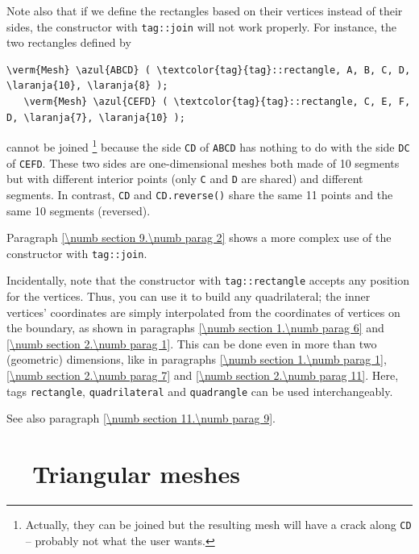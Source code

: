 Note also that if we define the rectangles based on their vertices instead of their sides, 
the {\small\tt {}} constructor with {\small\tt \textcolor{tag}{tag}::join} will
not work properly. 
For instance, the two rectangles defined by

\begin{Verbatim}[commandchars=\\\{\},formatcom=\small\tt,baselinestretch=0.94]
   \verm{Mesh} \azul{ABCD} ( \textcolor{tag}{tag}::rectangle, A, B, C, D, \laranja{10}, \laranja{8} );
   \verm{Mesh} \azul{CEFD} ( \textcolor{tag}{tag}::rectangle, C, E, F, D, \laranja{7}, \laranja{10} );
\end{Verbatim}

\noindent cannot be joined%
\footnote {Actually, they can be joined but the resulting mesh will have
a crack along {\small\tt CD} -- probably not what the user wants.}
because the side {\small\tt CD} of {\small\tt ABCD} has nothing to do with the side 
{\small\tt DC} of {\small\tt CEFD}.
These two sides are one-dimensional meshes both made of 10 segments but with different
interior points (only {\small\tt C} and {\small\tt D} are shared) and different segments.
In contrast, {\small\tt CD} and {\small\tt CD.reverse()} share the same 11 points and
the same 10 segments (reversed).

Paragraph \ref{\numb section 9.\numb parag 2} shows a more complex use of the
{\small\tt {}} constructor with {\small\tt \textcolor{tag}{tag}::join}.

Incidentally, note that the {\small\tt {}} constructor with {\small\tt \textcolor{tag}{tag}::rectangle} accepts
any position for the vertices. 
Thus, you can use it to build any quadrilateral; the inner vertices' coordinates are simply
interpolated from the coordinates of vertices on the boundary, as shown in paragraphs
\ref{\numb section 1.\numb parag 6} and \ref{\numb section 2.\numb parag 1}.
This can be done even in more than two (geometric) dimensions, like in
paragraphs \ref{\numb section 1.\numb parag 1}, \ref{\numb section 2.\numb parag 7} and
\ref{\numb section 2.\numb parag 11}.
Here, tags {\small\tt rectangle}, {\small\tt quadrilateral} and {\small\tt quadrangle} can be used
interchangeably.

See also paragraph \ref{\numb section 11.\numb parag 9}.


\section{~~Triangular meshes}\label{\numb section 1.\numb parag 5}

